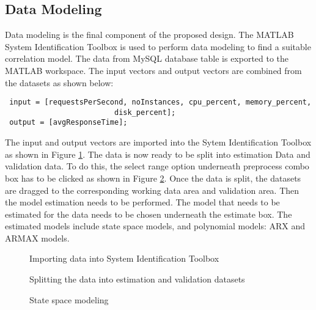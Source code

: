 \documentclass[article,type=msc,colorback,12pt,accentcolor=tud8b,table]{tudthesis}
\begin{document}
	\subsection{Data Modeling}
 
 Data modeling is the final component of the proposed design. The MATLAB System Identification Toolbox is used to perform data modeling to find a suitable correlation model. The data from MySQL database table is exported to the MATLAB workspace. The input vectors and output vectors are combined from the datasets as shown below:
 \begin{lstlisting} 
 input = [requestsPerSecond, noInstances, cpu_percent, memory_percent, 
						 disk_percent];
 output = [avgResponseTime];
 \end{lstlisting}
  The input and output vectors are imported into the Sytem Identification Toolbox as shown in Figure \ref{fig:dataset_import}. The data is now ready to be split into estimation Data and validation data. To do this, the select range option underneath preprocess combo box has to be clicked as shown in Figure \ref{fig:split_dataset}. 
  Once the data is split, the datasets are dragged to the corresponding working data area and validation area. Then the model estimation needs to be performed. The model that needs to be estimated for the data needs to be chosen underneath the estimate box. The estimated models include state space models, and polynomial models: ARX and ARMAX models.
  
      \begin{figure}[H]
      	\begin{center}
      		\makebox[\textwidth]{\texttt{[image: D6]}}
      	\end{center}
      	\caption{Importing data into System Identification Toolbox}
      	\label{fig:dataset_import}
      \end{figure}
   
      \begin{figure}[H]
      	\begin{center}
      		\makebox[\textwidth]{\texttt{[image: D7]}}
      	\end{center}
      	\caption{Splitting the data into estimation and validation datasets}
      	\label{fig:split_dataset}
      \end{figure}	

	\begin{figure}[H]
		\begin{center}
			\makebox[\textwidth]{\texttt{[image: E11]}}
		\end{center}
		\caption{State space modeling}
		\label{fig:state_space_matlab}
	\end{figure}
	
\end{document}
